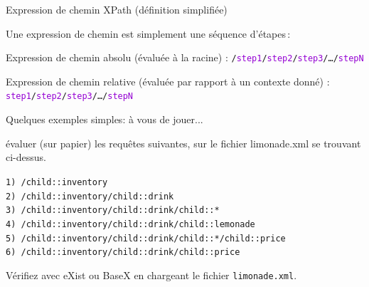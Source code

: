 \begin{frame}{Expression de chemin XPath (définition simplifiée)}

Une expression de chemin est simplement une séquence d'étapes\,:

\vfill

Expression de \alert{chemin absolu} (évaluée à la racine) : 
\texttt{/\textcolor{DarkViolet}{step1}/\textcolor{DarkViolet}{step2}/\textcolor{DarkViolet}{step3}/…/\textcolor{DarkViolet}{stepN}}
\\

\vfill 

Expression de \alert{chemin relative} (évaluée par rapport à un contexte donné) : 
\texttt{\textcolor{DarkViolet}{step1}/\textcolor{DarkViolet}{step2}/\textcolor{DarkViolet}{step3}/…/\textcolor{DarkViolet}{stepN}}
\\

\end{frame}

\begin{frame}{Quelques exemples simples: à vous de jouer...}

\vspace{-0.3cm}

\begin{footnotesize}



\vspace{-0.3cm}

\begin{exoblock}

évaluer (sur papier) les requêtes suivantes, sur le fichier limonade.xml se trouvant ci-dessus.

\noindent \texttt{1) /child::inventory \\
2) /child::inventory/child::drink \\
3) /child::inventory/child::drink/child::*\\
4) /child::inventory/child::drink/child::lemonade\\
5) /child::inventory/child::drink/child::*/child::price\\
6) /child::inventory/child::drink/child::price\\
}

Vérifiez avec eXist ou BaseX en chargeant le fichier \texttt{limonade.xml}.
\end{exoblock}
\end{footnotesize}

\end{frame}


